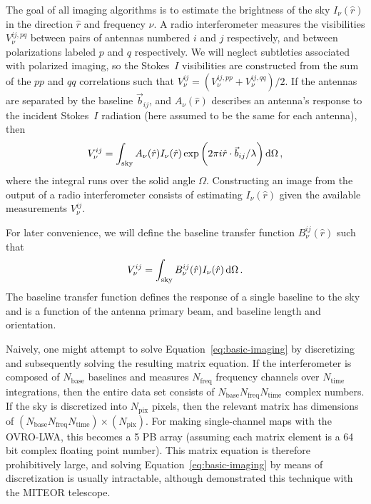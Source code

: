\documentclass[twocolumn]{aastex61}
\renewcommand{\d}{{\rm d}}
\begin{document}
The goal of all imaging algorithms is to estimate the brightness of the sky $I_\nu(\hat r)$ in the
direction $\hat r$ and frequency $\nu$.  A radio interferometer measures the visibilities
$V^{ij,pq}_{\nu}$ between pairs of antennas numbered $i$ and $j$ respectively, and between
polarizations labeled $p$ and $q$ respectively. We will neglect subtleties associated with polarized
imaging, so the Stokes~$I$ visibilities are constructed from the sum of the $pp$ and $qq$
correlations such that $V^{ij}_{\nu} = (V^{ij,pp}_{\nu}+V^{ij,qq}_{\nu})/2$.  If the antennas are
separated by the baseline $\vec b_{ij}$, and $A_\nu(\hat r)$ describes an antenna's response to the
incident Stokes~$I$ radiation (here assumed to be the same for each antenna), then
\begin{equation}\label{eq:basic-imaging}
    V^{ij}_\nu = \int_\text{sky}
                 A_\nu(\hat r) I_\nu(\hat r)
                 \exp\bigg(2\pi i \hat r\cdot\vec b_{ij}/\lambda\bigg) \,\d\Omega \, ,
\end{equation}
where the integral runs over the solid angle $\Omega$.  Constructing an image from the output of a
radio interferometer consists of estimating $I_\nu(\hat r)$ given the available measurements
$V^{ij}_\nu$.

For later convenience, we will define the baseline transfer function $B^{ij}_\nu(\hat r)$ such that
\begin{equation}\label{eq:baseline-transfer-function}
    V^{ij}_\nu = \int_\text{sky} B^{ij}_\nu(\hat r) I_\nu(\hat r) \,\d\Omega \, .
\end{equation}
The baseline transfer function defines the response of a single baseline to the sky and is a
function of the antenna primary beam, and baseline length and orientation.

Naively, one might attempt to solve Equation~\ref{eq:basic-imaging} by discretizing and
subsequently solving the resulting matrix equation. If the interferometer is composed of
$N_\text{base}$ baselines and measures $N_\text{freq}$ frequency channels over $N_\text{time}$
integrations, then the entire data set consists of $N_\text{base}N_\text{freq}N_\text{time}$ complex
numbers. If the sky is discretized into $N_\text{pix}$ pixels, then the relevant matrix has
dimensions of $(N_\text{base}N_\text{freq}N_\text{time})\times(N_\text{pix})$. For making
single-channel maps with the OVRO-LWA, this becomes a 5 PB array (assuming each matrix element
is a 64 bit complex floating point number).  This matrix equation is therefore prohibitively large,
and solving Equation~\ref{eq:basic-imaging} by means of discretization is usually intractable,
although \citet{2017MNRAS.465.2901Z} demonstrated this technique with the MITEOR telescope.
\end{document}
